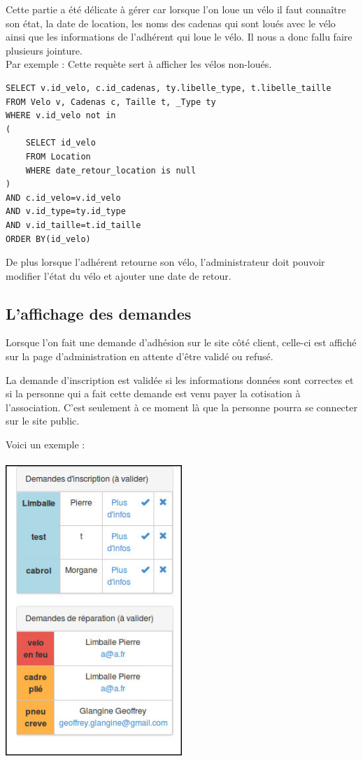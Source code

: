 \documentclass[11pt,a4paper,titlepage]{report}
\begin{document}
Cette partie a été délicate à gérer car lorsque l'on loue un vélo il faut connaître son état, la date de location, les noms des cadenas qui sont loués avec le vélo ainsi que les informations de l'adhérent qui loue le vélo. Il nous a donc fallu faire plusieurs jointure.\\

Par exemple : Cette requète sert à afficher les vélos non-loués. 
\begin{verbatim}
SELECT v.id_velo, c.id_cadenas, ty.libelle_type, t.libelle_taille
FROM Velo v, Cadenas c, Taille t, _Type ty 
WHERE v.id_velo not in
(
    SELECT id_velo 
    FROM Location 
    WHERE date_retour_location is null
)
AND c.id_velo=v.id_velo
AND v.id_type=ty.id_type
AND v.id_taille=t.id_taille
ORDER BY(id_velo) 
\end{verbatim} 

De plus lorsque l'adhérent retourne son vélo, l'administrateur doit pouvoir modifier l'état du vélo et ajouter une date de retour. 

\subsection{L'affichage des demandes}
Lorsque l'on fait une demande d'adhésion sur le site côté client, celle-ci est affiché sur la page d'administration en attente d'être validé ou refusé.

La demande d'inscription est validée si les informations données sont correctes et si la personne qui a fait cette demande est venu payer la cotisation à l'association. C'est seulement à ce moment là que la personne pourra se connecter sur le site public.

Voici un exemple :\\\\
\includegraphics[width=0.5\textwidth]{demande.jpg}~
\end{document}
